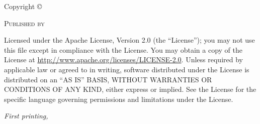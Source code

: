 \newpage
\thispagestyle{empty} %

\begin{fullwidth}
\vspace*{120mm} %
\setlength{\parindent}{0pt} %
\setlength{\parskip}{\baselineskip} %

Copyright \copyright\ \the\year\ %

\par\textsc{Published by \publisher}

\par Licensed under the Apache License, Version 2.0 (the ``License''); you may not
use this file except in compliance with the License. You may obtain a copy
of the License at \url{http://www.apache.org/licenses/LICENSE-2.0}. Unless
required by applicable law or agreed to in writing, software distributed
under the License is distributed on an \textsc{``AS IS'' BASIS, WITHOUT
WARRANTIES OR CONDITIONS OF ANY KIND}, either express or implied. See the
License for the specific language governing permissions and limitations
under the License.

\par\textit{First printing, \monthyear}

\end{fullwidth}

